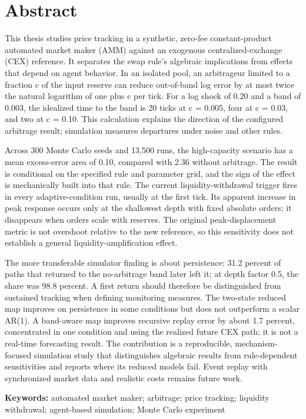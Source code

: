 \section{Abstract}

This thesis studies price tracking in a synthetic, zero-fee constant-product automated market maker (AMM) against an exogenous centralized-exchange (CEX) reference. It separates the swap rule's algebraic implications from effects that depend on agent behavior. In an isolated pool, an arbitrageur limited to a fraction c of the input reserve can reduce out-of-band log error by at most twice the natural logarithm of one plus c per tick. For a log shock of 0.20 and a band of 0.003, the idealized time to the band is 20 ticks at c = 0.005, four at c = 0.03, and two at c = 0.10. This calculation explains the direction of the configured arbitrage result; simulation measures departures under noise and other rules.

Across 300 Monte Carlo seeds and 13,500 runs, the high-capacity scenario has a mean excess-error area of 0.10, compared with 2.36 without arbitrage. The result is conditional on the specified rule and parameter grid, and the sign of the effect is mechanically built into that rule. The current liquidity-withdrawal trigger fires in every adaptive-condition run, usually at the first tick. Its apparent increase in peak response occurs only at the shallowest depth with fixed absolute orders; it disappears when orders scale with reserves. The original peak-displacement metric is not overshoot relative to the new reference, so this sensitivity does not establish a general liquidity-amplification effect.

The more transferable simulator finding is about persistence: 31.2 percent of paths that returned to the no-arbitrage band later left it; at depth factor 0.5, the share was 98.8 percent. A first return should therefore be distinguished from sustained tracking when defining monitoring measures. The two-state reduced map improves on persistence in some conditions but does not outperform a scalar AR(1). A band-aware map improves recursive replay error by about 1.7 percent, concentrated in one condition and using the realized future CEX path; it is not a real-time forecasting result. The contribution is a reproducible, mechanism-focused simulation study that distinguishes algebraic results from rule-dependent sensitivities and reports where its reduced models fail. Event replay with synchronized market data and realistic costs remains future work.

\textbf{Keywords:} automated market maker; arbitrage; price tracking; liquidity withdrawal; agent-based simulation; Monte Carlo experiment
